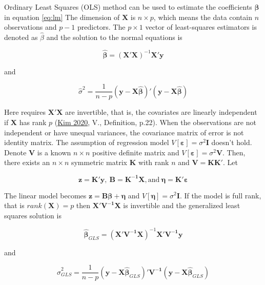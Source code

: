 \documentclass[
  11pt,
  openany]{memoir}
\begin{document}
Ordinary Least Squares (OLS) method can be used to estimate the coefficients \(\boldsymbol{\beta}\) in equation \eqref{eq:lm} The dimension of \(\mathbf{X}\) is \(n\times p\), which means the data contain \(n\) observations and \(p-1\) predictors. The \(p\times1\) vector of least-squares estimators is denoted as \(\hat\beta\) and the solution to the normal equations is

\begin{equation}
\boldsymbol{\hat\beta}=(\mathbf{X'X})^{-1}\mathbf{X'}\mathbf{y}
\label{eq:lsq-e}
\end{equation}

and

\begin{equation}
\hat\sigma^2=\frac1{n-p}(\mathbf{y-X}\boldsymbol{\hat\beta})'(\mathbf{y-X}\boldsymbol{\hat\beta})
\label{eq:lsq-v}
\end{equation}

Here requires \(\mathbf{X'X}\) are invertible, that is, the covariates are linearly independent if \(\mathbf{X}\) has rank \(p\) (\protect\hyperlink{ref-kimLectureNotes2020}{Kim 2020}, V., Definition, p.22).
When the observations are not independent or have unequal variances, the covariance matrix of error is not identity matrix. The assumption of regression model \(V[\boldsymbol{\varepsilon}]=\sigma^2\mathbf{I}\) doesn't hold. Denote \(\mathbf{V}\) is a known \(n\times n\) positive definite matrix and \(V[\boldsymbol{\varepsilon}]=\sigma^2\mathbf{V}\).
Then, there exists an \(n\times n\) symmetric matrix \(\mathbf{K}\) with rank \(n\) and \(\mathbf{V}=\mathbf{KK'}\). Let

\begin{equation}
\mathbf{z}=\mathbf{K'y},\ \mathbf{B}=\mathbf{K^{-1}X}, \text{and}\ \boldsymbol{\eta}=\mathbf{K'}\boldsymbol{\varepsilon}
\end{equation}

The linear model becomes \(\mathbf{z}=\mathbf{B}\boldsymbol{\beta}+\boldsymbol{\eta}\) and \(V[\boldsymbol{\eta}]=\sigma^2\mathbf{I}\).
If the model is full rank, that is \(rank(\mathbf{X})=p\) then \(\mathbf{X'V^{-1}X}\) is invertible
and the generalized least squares solution is

\begin{equation}
\boldsymbol{\hat\beta}_{GLS}=(\mathbf{X'V^{-1}X})^{-1}\mathbf{X'V^{-1}}\mathbf{y}
\label{eq:glsq-e}
\end{equation}

and

\begin{equation}
\hat\sigma^2_{GLS}=\frac1{n-p}(\mathbf{y-X}\boldsymbol{\hat\beta}_{GLS})'\mathbf{V^{-1}}(\mathbf{y-X}\boldsymbol{\hat\beta}_{GLS})
\label{eq:glsq-v}
\end{equation}
\end{document}
